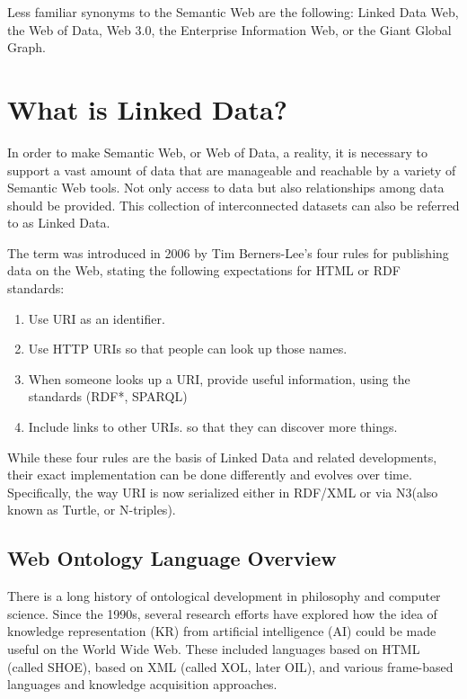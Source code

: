 \documentclass[thesis=M,english,hidelinks]{FITthesis}[2019/12/23]
\begin{document}
Less familiar synonyms to the Semantic Web are the following: Linked Data Web, the Web of Data, Web 3.0, the Enterprise Information Web, or the Giant Global Graph.

\section{What is Linked Data?}

In order to make Semantic Web, or Web of Data, a reality, it is necessary to support a vast amount of data that are manageable and reachable by a variety of Semantic Web tools. Not only access to data but also relationships among data should be provided. This collection of interconnected datasets can also be referred to as Linked Data.

The term was introduced in 2006 by Tim Berners-Lee's four rules for publishing data on the Web\cite{Berners_LinkedData}, stating the following expectations for \gls{HTML} or \gls{RDF} standards:
\begin{enumerate}
	\item Use \gls{URI} as an identifier.
	\item Use \gls{HTTP} \gls{URI}s so that people can look up those names.
	\item When someone looks up a \gls{URI}, provide useful information, using the standards (\gls{RDF}*, \gls{SPARQL})
	\item Include links to other \gls{URI}s. so that they can discover more things.
\end{enumerate}

While these four rules are the basis of Linked Data and related developments, their exact implementation can be done differently and evolves over time. Specifically, the way \gls{URI} is now serialized either in \gls{RDF}/\gls{XML} or via N3(also known as Turtle, or N-triples).

\subsection{Web Ontology Language Overview}

There is a long history of ontological development in philosophy and computer science. Since the 1990s, several research efforts have explored how the idea of knowledge representation (KR) from artificial intelligence (AI) could be made useful on the World Wide Web. These included languages based on HTML (called SHOE), based on XML (called XOL, later OIL), and various frame-based languages and knowledge acquisition approaches.
\end{document}
